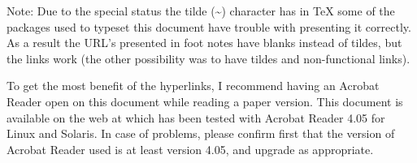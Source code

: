 Note:  Due to the special status the tilde (\~{}) character has in
{\TeX} some of the packages used to typeset this document have trouble
with presenting it correctly.  As a result the URL's presented in foot
notes have blanks instead of tildes, but the links work  (the other
possibility was to have tildes and non-functional links).  

To get the most benefit of the hyperlinks, I recommend having an
Acrobat Reader open on this document while reading a paper version. 
This document is available on the web at
which has been tested with Acrobat Reader 4.05 for Linux and
Solaris.  In case of problems, please confirm first that the version
of Acrobat Reader used is at least version 4.05, and upgrade as
appropriate. 




